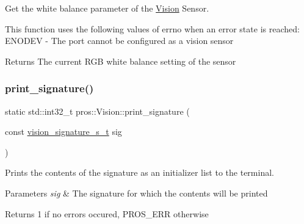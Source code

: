 Get the white balance parameter of the \hyperlink{classpros_1_1Vision}{Vision} Sensor.

This function uses the following values of errno when an error state is reached\+: E\+N\+O\+D\+EV -\/ The port cannot be configured as a vision sensor

\begin{DoxyReturn}{Returns}
The current R\+GB white balance setting of the sensor 
\end{DoxyReturn}
\mbox{\label{classpros_1_1Vision_ada22311366ce088fa9ac08a8e3510800}} 
\subsubsection{\texorpdfstring{print\+\_\+signature()}{print\_signature()}}
{\footnotesize\ttfamily static std\+::int32\+\_\+t pros\+::\+Vision\+::print\+\_\+signature (\begin{DoxyParamCaption}\item[{const \hyperlink{vision_8h_a135c729c7277f6cc019c2924088a5fd5}{vision\+\_\+signature\+\_\+s\+\_\+t}}]{sig }\end{DoxyParamCaption})\hspace{0.3cm}{\ttfamily [static]}}

Prints the contents of the signature as an initializer list to the terminal.


\begin{DoxyParams}{Parameters}
{\em sig} & The signature for which the contents will be printed\\
\hline
\end{DoxyParams}
\begin{DoxyReturn}{Returns}
1 if no errors occured, P\+R\+O\+S\+\_\+\+E\+RR otherwise 
\end{DoxyReturn}
\mbox{\label{classpros_1_1Vision_afbe909146f5cf396b322467885731d04}} 
